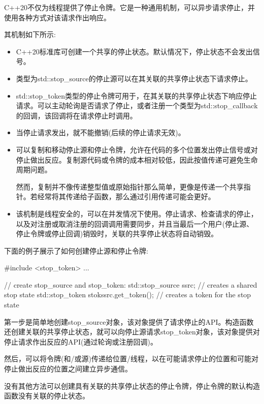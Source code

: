 
C++20不仅为线程提供了停止令牌。它是一种通用机制，可以异步请求停止，并使用各种方式对该请求作出响应。

其机制如下所示:

\begin{itemize}
\item
C++20标准库可创建一个共享的停止状态。默认情况下，停止状态不会发出信号。

\item
类型为std::stop\_source的停止源可以在其关联的共享停止状态下请求停止。

\item
std::stop\_token类型的停止令牌可用于，在其关联的共享停止状态下响应停止请求。可以主动轮询是否请求了停止，或者注册一个类型为std::stop\_callback的回调，该回调将在请求停止时调用。

\item
当停止请求发出，就不能撤销(后续的停止请求无效)。

\item
可以复制和移动停止源和停止令牌，允许在代码的多个位置发出停止信号或对停止做出反应。复制源代码或令牌的成本相对较低，因此按值传递可避免生命周期问题。

然而，复制并不像传递整型值或原始指针那么简单，更像是传递一个共享指针。若经常将其传递给子函数，那么通过引用传递可能会更好。

\item
该机制是线程安全的，可以在并发情况下使用。停止请求、检查请求的停止，以及对注册或取消注册的回调调用需要同步，并且当最后一个用户(停止源、停止令牌或停止回调)销毁时，关联的共享停止状态将自动销毁。
\end{itemize}

下面的例子展示了如何创建停止源和停止令牌:

\begin{cpp}
#include <stop_token>
...

// create stop_source and stop_token:
std::stop_source ssrc; // creates a shared stop state
std::stop_token stok{ssrc.get_token()}; // creates a token for the stop state
\end{cpp}

第一步是简单地创建stop\_source对象，该对象提供了请求停止的API。构造函数还创建关联的共享停止状态，就可以向停止源请求stop\_token对象，该对象提供对停止请求作出反应的API(通过轮询或注册回调)。

然后，可以将令牌(和/或源)传递给位置/线程，以在可能请求停止的位置和可能对停止做出反应的位置之间建立异步通信。

没有其他方法可以创建具有关联的共享停止状态的停止令牌，停止令牌的默认构造函数没有关联的停止状态。

